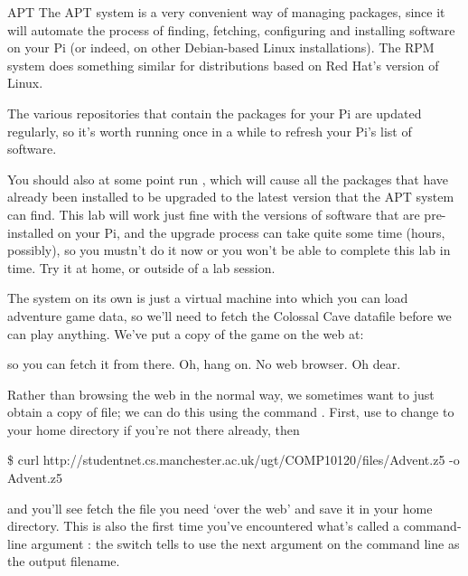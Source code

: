 \begin{rpi}{APT}
The APT system is a very convenient way of managing packages, since it will automate the process of finding, fetching, configuring and installing software on your Pi (or indeed, on other Debian-based Linux installations). The RPM system does something similar for distributions based on Red Hat's version of Linux.

The various repositories that contain the packages for your Pi are updated regularly, so it's worth running  once in a while to refresh your Pi's list of software.

You should also at some point run , which will cause all the packages that have already been installed to be upgraded to the latest version that the APT system can find. This lab will work just fine with the versions of software that are pre-installed on your Pi, and the upgrade process can take quite some time (hours, possibly), so you mustn't do it now or you won't be able to complete this lab in time. Try it at home, or outside of a lab session.
\end{rpi}

The  system on its own is just a virtual machine into which you can load adventure game data, so we'll need to fetch the Colossal Cave datafile before we can play anything. We've put a copy of the game on the web at:

\noindent {}

\noindent so you can fetch it from there. Oh, hang on. No web browser. Oh dear.

Rather than browsing the web in the normal way, we sometimes want to just obtain a copy of file; we can do this using the command  . First, use  to change to your home directory if you're not there already, then

\begin{ttoutenv}
\footnotesize
\$ curl http://studentnet.cs.manchester.ac.uk/ugt/COMP10120/files/Advent.z5 -o Advent.z5
\end{ttoutenv}

\noindent and you'll see  fetch the file you need `over the web' and save it in your home directory. This is also the first time you've encountered what's called a command-line argument : the  switch tells  to use the next argument on the command line as the output filename.

